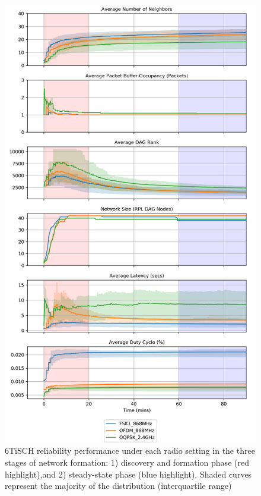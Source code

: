 \documentclass[journal]{IEEEtran}
\begin{document}
\begin{figure}
	\centering
	\includegraphics[width=0.90\columnwidth]{aggregate_plot_reliability}
	\caption{6TiSCH reliability performance under each radio setting in the three stages of network formation: 1) discovery and formation phase (red highlight),and 2) steady-state phase (blue highlight). Shaded curves represent the majority of the distribution (interquartile range)}
    \label{fig:aggregate_plot_reliability}
\end{figure}

\end{document}
